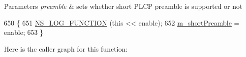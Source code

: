 \begin{DoxyParams}{Parameters}
{\em preamble} & sets whether short P\+L\+CP preamble is supported or not \\
\hline
\end{DoxyParams}

\begin{DoxyCode}
650 \{
651   \hyperlink{log-macros-disabled_8h_a90b90d5bad1f39cb1b64923ea94c0761}{NS\_LOG\_FUNCTION} (\textcolor{keyword}{this} << enable);
652   \hyperlink{classns3_1_1WifiPhy_ad2df70b891c138ec13289ec813696732}{m\_shortPreamble} = enable;
653 \}
\end{DoxyCode}


Here is the caller graph for this function\+:


